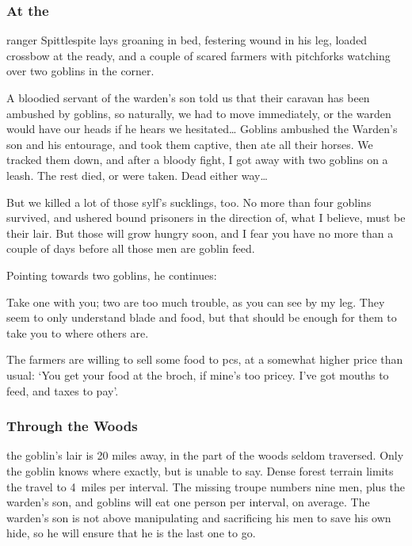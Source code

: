 \documentclass[10pt,twoside]{book}
\begin{document}
\subsubsection{At the }
\gls{ranger} Spittlespite lays groaning in bed, festering wound in his leg, loaded crossbow at the ready, and a couple of scared farmers with pitchforks watching over two goblins in the corner.

\begin{speechtext}
  A bloodied servant of the warden's son told us that their caravan has been ambushed by goblins, so naturally, we had to move immediately, or the warden would have our heads if he hears we hesitated\ldots
  Goblins ambushed the Warden's son and his entourage, and took them captive, then ate all their horses.
  We tracked them down, and after a bloody fight, I got away with two goblins on a leash.
  The rest died, or were taken.
  Dead either way\ldots
  
  But we killed a lot of those \gls{sylf}'s sucklings, too.
  No more than four goblins survived, and ushered bound prisoners in the direction of, what I believe, must be their lair.
  But those will grow hungry soon, and I fear you have no more than a couple of days before all those men are goblin feed.
\end{speechtext}

Pointing towards two goblins, he continues:

\begin{speechtext}
  Take one with you; two are too much trouble, as you can see by my leg.
  They seem to only understand blade and food, but that should be enough for them to take you to where others are.
\end{speechtext}

The farmers are willing to sell some food to \glspl{pc}, at a somewhat higher price than usual: `You get your food at the \gls{broch}, if mine's too pricey.
I've got mouths to feed, and taxes to pay'.

\subsubsection{Through the Woods}
the goblin's lair is 20 miles away, in the part of the woods seldom traversed.
Only the goblin knows where exactly, but is unable to say.
Dense forest terrain limits the travel to 4~miles per \gls{interval}.
The missing troupe numbers nine men, plus the \gls{warden}'s son, and goblins will eat one person per \gls{interval}, on average.
The \gls{warden}'s son is not above manipulating and sacrificing his men to save his own hide, so he will ensure that he is the last one to go.
\end{document}
